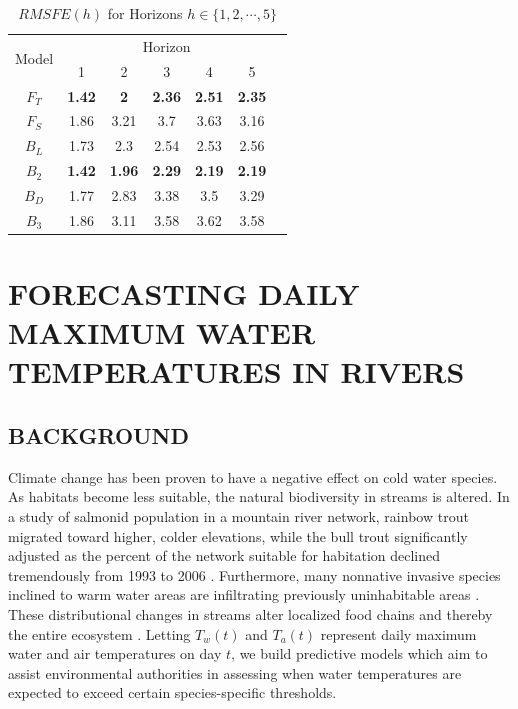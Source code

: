 \begin{table}[!h]
	\small
  \centering
  \caption{$RMSFE(h)$ for Horizons $h \in \{1,2,\cdots,5\}$}
    \begin{tabular}{ccccccc}
    \toprule
     \multirow{2}[0]{*}{Model} & \multicolumn{5}{c}{Horizon} \\
                 & 1    & 2    & 3    & 4    & 5 \\
         \midrule
     $F_T$ &  {\bf 1.42} &  {\bf2}    &  {\bf2.36} &  {\bf2.51} & {\bf2.35} \\
            $F_S$ & 1.86 & 3.21 & 3.7  & 3.63 & 3.16 \\
         \midrule
       $B_L$ & 1.73 & 2.3  & 2.54 & 2.53 & 2.56 \\
        $B_2$ & {\bf 1.42} & {\bf1.96} &  {\bf2.29} &  {\bf2.19} & {\bf2.19} \\
         $B_D$ & 1.77 & 2.83 & 3.38 & 3.5  & 3.29 \\
          $B_3$ & 1.86 & 3.11 & 3.58 & 3.62 & 3.58 \\
    \bottomrule
    \end{tabular}%
  \label{tab:ssrmsfe}%
\end{table}%


\section{FORECASTING DAILY MAXIMUM WATER TEMPERATURES IN RIVERS}

\subsection{BACKGROUND}

Climate change has been proven to have a negative effect on cold water species. As habitats become less suitable, the natural biodiversity in streams is altered. In a study of salmonid population in a mountain river network, rainbow trout migrated toward higher, colder elevations, while the bull trout significantly adjusted as the percent of the network suitable for habitation declined tremendously from 1993 to 2006 \citep{Isaak2010}. Furthermore, many nonnative invasive species inclined to warm water areas are infiltrating previously uninhabitable areas \citep{Rahel2008}. These distributional changes in streams alter localized food chains and thereby the entire ecosystem \citep{Albouy2014}. Letting $T_w(t)$ and $T_a(t)$ represent daily maximum water and air temperatures on day $t$, we build predictive models which aim to assist environmental authorities in assessing when water temperatures are expected to exceed certain species-specific thresholds.

